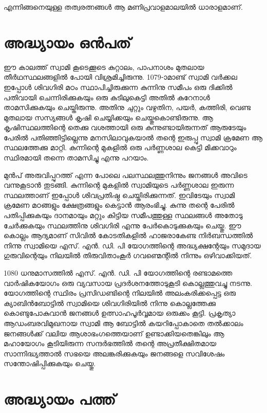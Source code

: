 \documentclass[12pt,openany]{book}
\begin{document}
	എന്നിങ്ങനെയുള്ള തത്വരത്നങ്ങൾ ആ മണിപ്രവാളമാലയിൽ ധാരാളമാണ്.
	
	\newpage
	
	\chapter*{അദ്ധ്യായം ഒൻപത്}
	
	ഈ കാലത്ത് സ്വാമി കൂടെക്കൂടെ കുറ്റാലം, പാപനാശം മുതലായ തീർഥസ്ഥലങ്ങളിൽ പോയി വിശ്രമിച്ചിരുന്നു. 1079-ാമാണ്ട് സ്വാമി വർക്കല ഇപ്പോൾ ശിവഗിരി മഠം സ്ഥാപിച്ചിരുക്കുന്ന കുന്നിനു സമീപം ഒരു ദിക്കിൽ പതിവായി ചെന്നിരിക്കുകയും ഒരു കുടിലുകെട്ടി അതിൽ കുറേനാൾ താമസിക്കുകയും ചെയ്തിരുന്നു. അതിനു ചുറ്റും വഴുതിന, പയർ, കത്തിരി, വെണ്ട മുതലായ സസ്യങ്ങൾ കൃഷി ചെയ്യിക്കയും ചെയ്തുകൊണ്ടിരുന്നു. ആ കൃഷിസ്ഥലത്തിന്റെ തെക്കു വശത്തായി ഒരു കുന്നുണ്ടായിരുന്നത് ആരുടേയും പേരിൽ പതിഞ്ഞിട്ടില്ലെന്നു മനസിലാവുകയാൽ തന്റെ ഇരുപ്പു സ്വാമി ക്രമേണ ആ സ്ഥലത്തേക്കു മാറ്റി. കുന്നിന്റെ മുകളിൽ ഒരു പർണ്ണശാല കെട്ടി മിക്കവാറും സ്ഥിരമായി തന്നെ താമസിച്ചു എന്നു പറയാം.
	
	മുൻപ് അരുവിപ്പുറത്ത് എന്ന പോലെ പലസ്ഥലത്തുനിന്നും ജനങ്ങൾ അവിടെ വന്നുകൂടാൻ തുടങ്ങി. കുന്നിന്റെ മുകളിൽ സ്വാമിയുടെ പർണ്ണശാല ഇരുന്ന സ്ഥലത്താണ് ഇപ്പോൾ ശിവപ്രതിഷ്ഠ ചെയ്തിരിക്കുന്നത്. ഇവിടേയും സ്വാമി ക്രമേണ മഠങ്ങളും ക്ഷേത്രങ്ങളും കെട്ടാൻ ആരംഭിച്ചു. കുന്നു തന്റെ പേരിൽ പതിപ്പിക്കുകയും ദാനമായും മറ്റും കിട്ടിയ സമീപത്തുള്ള സ്ഥലങ്ങൾ അതോടു ചേർക്കുകയും സ്ഥലത്തിനു ശിവഗിരി എന്നു പേർകൊടുക്കുകയും ചെയ്തു. ഈ കൊല്ലം ആദ്യമാണ് സിവിൽ കോടതികളിൽ ഹാജരാകേണ്ട നിർബന്ധത്തിൽ നിന്നു സ്വാമിയെ എസ്. എൻ. ഡി. പി യോഗത്തിന്റെ അദ്ധ്യക്ഷന്റേയും സമുദായ ഗുരുവിന്റെയും നിലയിൽ തിരുവിതാംകൂർ ഗവണ്മെന്റിൽ നിന്നും ഒഴിവാക്കിയത്.
	
	1080 ധനുമാസത്തിൽ എസ്. എൻ. ഡി. പി യോഗത്തിന്റെ രണ്ടാമത്തെ വാർഷികയോഗം ഒരു വ്യവസായ പ്രദർശനത്തോടുകൂടി കൊല്ലത്തുവച്ചു നടന്നു. യോഗത്തിന്റെ സ്ഥിരം പ്രസിഡണ്ടിന്റെ നിലയിൽ അലംകരിക്കപ്പെട്ട ഒരു ക്യാബിൻബോട്ടിൽ സ്വാമിയെ ശിവഗിരിയിൽ നിന്നു കൊല്ലത്തേക്കു കൊണ്ടുപോകുവാൻ ജനങ്ങൾ ഉത്സാഹപൂർവ്വമായ ഒരുക്കം കൂട്ടി. പ്രകൃത്യാ ആഡംബരവിമുഖനായ സ്വാമി ആ ബോട്ടിൽ കയറിപ്പോകാതെ തൽക്കാലം ജനങ്ങൾക്ക് വലിയ ആശാഭംഗത്തെയാണ് ഉണ്ടാക്കിയതെങ്കിലും ആ മഹായോഗം കൂടിയിരുന്ന സന്ദർഭത്തിൽ തന്റെ അപ്രതീക്ഷിതമായ സാന്നിദ്ധ്യത്താൽ സഭയെ അലങ്കരിക്കുകയും ജനങ്ങളെ സവിശേഷം സന്തോഷിപ്പിക്കുകയും ചെയ്തു.
	
	\newpage
	
	\chapter*{അദ്ധ്യായം പത്ത്}	
	
\end{document}
